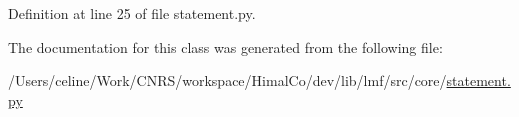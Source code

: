 Definition at line 25 of file statement.\+py.



The documentation for this class was generated from the following file\+:\begin{DoxyCompactItemize}
\item 
/\+Users/celine/\+Work/\+C\+N\+R\+S/workspace/\+Himal\+Co/dev/lib/lmf/src/core/\hyperlink{statement_8py}{statement.\+py}\end{DoxyCompactItemize}
